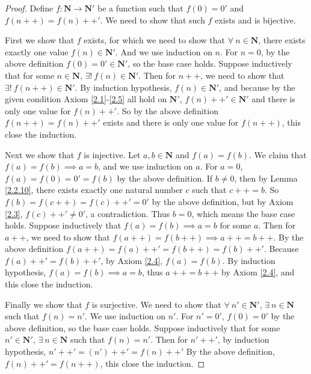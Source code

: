 \begin{proof}
    Define \(f : \mathbf{N} \to \mathbf{N}'\) be a function such that \(f(0) = 0'\) and \(f(n++) = f(n)++'\).
    We need to show that such \(f\) exists and is bijective.

    First we show that \(f\) exists, for which we need to show that \(\forall\ n \in \mathbf{N}\), there exists exactly one value \(f(n) \in \mathbf{N}'\).
    And we use induction on \(n\).
    For \(n = 0\), by the above definition \(f(0) = 0' \in \mathbf{N}'\), so the base case holds.
    Suppose inductively that for some \(n \in \mathbf{N}\), \(\exists!\ f(n) \in \mathbf{N}'\).
    Then for \(n++\), we need to show that \(\exists!\ f(n++) \in \mathbf{N}'\).
    By induction hypothesis, \(f(n) \in \mathbf{N}'\), and because by the given condition Axiom \ref{2.1}-\ref{2.5} all hold on \(\mathbf{N}'\), \(f(n)++' \in \mathbf{N}'\) and there is only one value for \(f(n)++'\).
    So by the above definition \(f(n++) = f(n)++'\) exists and there is only one value for \(f(n++)\), this close the induction.

    Next we show that \(f\) is injective.
    Let \(a, b \in \mathbf{N}\) and \(f(a) = f(b)\).
    We claim that \(f(a) = f(b) \implies a = b\), and we use induction on \(a\).
    For \(a = 0\), \(f(a) = f(0) = 0' = f(b)\) by the above definition.
    If \(b \neq 0\), then by Lemma \ref{2.2.10}, there exists exactly one natural number \(c\) such that \(c++ = b\).
    So \(f(b) = f(c++) = f(c)++' = 0'\) by the above definition, but by Axiom \ref{2.3}, \(f(c)++' \neq 0'\), a contradiction.
    Thus \(b = 0\), which means the base case holds.
    Suppose inductively that \(f(a) = f(b) \implies a = b\) for some \(a\).
    Then for \(a++\), we need to show that \(f(a++) = f(b++) \implies a++ = b++\).
    By the above definition \(f(a++) = f(a)++' = f(b++) = f(b)++'\).
    Because \(f(a)++' = f(b)++'\), by Axiom \ref{2.4}, \(f(a) = f(b)\).
    By induction hypothesis, \(f(a) = f(b) \implies a = b\), thus \(a++ = b++\) by Axiom \ref{2.4}, and this close the induction.

    Finally we show that \(f\) is surjective.
    We need to show that \(\forall\ n' \in \mathbf{N}'\), \(\exists\ n \in \mathbf{N}\) such that \(f(n) = n'\).
    We use induction on \(n'\).
    For \(n' = 0'\), \(f(0) = 0'\) by the above definition, so the base case holds.
    Suppose inductively that for some \(n' \in \mathbf{N}'\), \(\exists\ n \in \mathbf{N}\) such that \(f(n) = n'\).
    Then for \(n'++'\), by induction hypothesis, \(n'++' = (n')++' = f(n)++'\)
    By the above definition, \(f(n)++' = f(n++)\), this close the induction.
\end{proof}